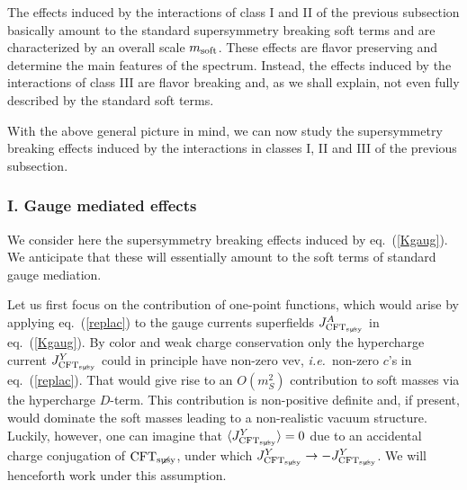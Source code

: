 \documentclass[a4paper,12pt]{article}
\def\eq#1{eq.~(\ref{#1})}
\def\eq#1{eq.~(\ref{#1})}
\def\mS{m_S}
\def\msoft{m_{\rm soft}}
\def\CFTs{{\rm CFT}_ {{\rm susy}\! \! \! \! \! \! \! \!\diagup \,\,\,}}
\begin{document}
The effects induced by the interactions of class I and II of the previous subsection  basically amount to the standard supersymmetry breaking soft terms and are characterized by an overall scale $\msoft$. These effects are flavor preserving and determine the main features of the spectrum. Instead, the effects induced by the interactions of class III are flavor breaking and, as we shall explain, not even fully described by the standard soft terms.



With the above general picture in mind, we can now study the supersymmetry breaking effects induced by the interactions in classes I, II and III of the previous subsection.

\subsubsection*{I. Gauge mediated effects}
We consider here the supersymmetry breaking effects induced by \eq{Kgaug}. We anticipate that these will essentially 
amount to  the soft terms of standard gauge mediation.


Let us first focus on the contribution of  one-point functions, which would arise by applying  \eq{replac} to the gauge currents  superfields $J_{\CFTs}^A$ in \eq{Kgaug}.  By color and weak charge conservation  only the hypercharge current $J_{\CFTs}^Y$ could in principle have non-zero vev, {\it i.e.}~non-zero $c$'s  in \eq{replac}. That would give rise to an  $O(\mS^2)$   contribution to soft masses via the hypercharge $D$-term. This contribution is non-positive definite and, if present, would dominate the soft masses leading to a non-realistic vacuum structure. Luckily, however, one can imagine that $\langle J_{\CFTs}^Y\rangle =0$ due to an accidental charge conjugation  of  $\CFTs$,  under which $J_{\CFTs}^Y\to -J_{\CFTs}^Y$.
We will henceforth work under this assumption. 
\end{document}
